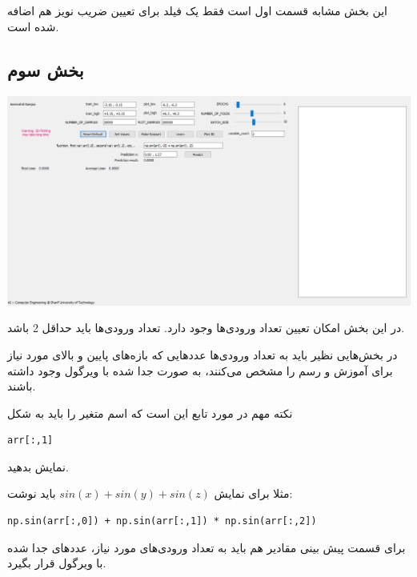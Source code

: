 \documentclass[12pt,titlepage,a4page , tikz , multi,table , svgnames,xcdraw]{article}
\begin{document}
این بخش مشابه قسمت اول است فقط یک فیلد برای تعیین ضریب نویز هم اضافه شده است.



\newpage


\subsection{بخش سوم}

\begin{center}

 \includegraphics[width=1.1\textwidth]{pictures/26.png}

\end{center}

در این بخش امکان تعیین تعداد ورودی‌ها وجود دارد. تعداد ورودی‌ها باید حداقل 2 باشد.

در بخش‌هایی نظیر  باید به تعداد ورودی‌ها عددهایی که بازه‌های پایین و بالای مورد نیاز برای آموزش و رسم را مشخص می‌کنند، به صورت جدا شده با ویرگول وجود داشته باشند.

نکته مهم در مورد تابع این است که اسم متغیر را باید به شکل 
\begin{latin}
\begin{verbatim}
arr[:,1]
\end{verbatim}
\end{latin}

نمایش بدهید.

مثلا برای نمایش 
$sin(x) + sin(y) + sin(z)$ باید نوشت:

\begin{latin}
\begin{verbatim}
np.sin(arr[:,0]) + np.sin(arr[:,1]) * np.sin(arr[:,2])
\end{verbatim}
\end{latin}


برای قسمت پیش بینی مقادیر هم باید به تعداد ورودی‌های مورد نیاز، عددهای جدا شده با ویرگول قرار بگیرد.
\end{document}
